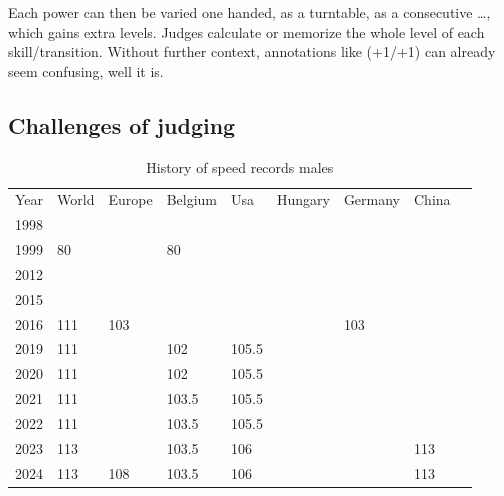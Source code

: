 Each power can then be varied one handed, as a turntable, as a consecutive \dots, which gains extra levels. Judges calculate or memorize the whole level of each skill/transition. Without further context, annotations like (+1/+1) can already seem confusing, well it is.



\subsection{Challenges of judging}
\label{subsubsec:literature-judge-challenges}

\begin{table}[]
    \begin{tabular}{lllllllll}
        Year & World & Europe & Belgium & Usa   & Hungary & Germany & China \\
        1998 &       &        &         &       &         &         &       \\
        1999 & 80    &        & 80      &       &         &         &       \\
        2012 &       &        &         &       &         &         &       \\
        2015 &       &        &         &       &         &         &       \\
        2016 & 111   & 103    &         &       &         & 103     &       \\
        2019 & 111   &        & 102     & 105.5 &         &         &       \\
        2020 & 111   &        & 102     & 105.5 &         &         &       \\
        2021 & 111   &        & 103.5   & 105.5 &         &         &       \\
        2022 & 111   &        & 103.5   & 105.5 &         &         &       \\
        2023 & 113   &        & 103.5   & 106   &         &         & 113   \\
        2024 & 113   & 108    & 103.5   & 106   &         &         & 113
    \end{tabular}
    \caption{History of speed records males}
    \label{tbl:speed-records-male}
\end{table}

